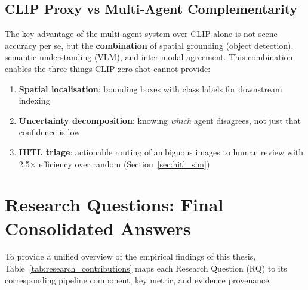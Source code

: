 \documentclass[12pt,onecolumn,a4paper]{IEEEtran}
\begin{document}
\subsection{CLIP Proxy vs Multi-Agent Complementarity}

The key advantage of the multi-agent system over CLIP alone is not scene accuracy per se, but the \textbf{combination} of spatial grounding (object detection), semantic understanding (VLM), and inter-modal agreement. This combination enables the three things CLIP zero-shot cannot provide:
\begin{enumerate}
    \item \textbf{Spatial localisation}: bounding boxes with class labels for downstream indexing
    \item \textbf{Uncertainty decomposition}: knowing \textit{which} agent disagrees, not just that confidence is low
    \item \textbf{HITL triage}: actionable routing of ambiguous images to human review with 2.5$\times$ efficiency over random (Section~\ref{sec:hitl_sim})
\end{enumerate}

\section{Research Questions: Final Consolidated Answers}
\label{sec:rq_final}

To provide a unified overview of the empirical findings of this thesis, Table~\ref{tab:research_contributions} maps each Research Question (RQ) to its corresponding pipeline component, key metric, and evidence provenance.
\end{document}
